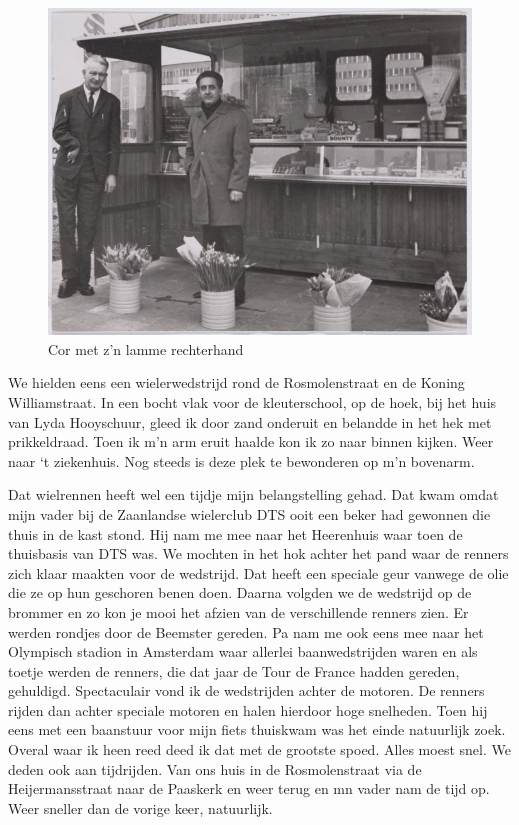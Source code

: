 \documentclass[10pt,twoside, openright]{memoir}
\begin{document}
\begin{figure}
\includegraphics[width=\textwidth]{img/79corknikker}
\caption*{\footnotesize Cor met z'n lamme rechterhand}
\end{figure}

We hielden eens een wielerwedstrijd rond de Rosmolenstraat en de Koning Williamstraat. In een bocht vlak voor de kleuterschool, op de hoek, bij het huis van Lyda Hooyschuur, gleed ik door zand onderuit en belandde in het hek met prikkeldraad. Toen ik m’n arm eruit haalde kon ik zo naar binnen kijken. Weer naar ‘t ziekenhuis. Nog steeds is deze plek te bewonderen op m’n bovenarm. 

Dat wielrennen heeft wel een tijdje mijn belangstelling gehad. Dat kwam omdat mijn vader bij de Zaanlandse wielerclub DTS ooit een beker had gewonnen die thuis in de kast stond. Hij nam me mee naar het Heerenhuis waar toen de thuisbasis van DTS was. We mochten in het hok achter het pand waar de renners zich klaar maakten voor de wedstrijd. Dat heeft een speciale geur vanwege de olie die ze op hun geschoren benen doen. Daarna volgden we de wedstrijd op de brommer en zo kon je mooi het afzien van de verschillende renners zien. Er werden rondjes door de Beemster gereden. Pa nam me ook eens mee naar het Olympisch stadion in Amsterdam waar allerlei baanwedstrijden waren en als toetje werden de renners, die dat jaar de Tour de France hadden gereden, gehuldigd. Spectaculair vond ik de wedstrijden achter de motoren. De renners rijden dan achter speciale motoren en halen hierdoor hoge snelheden. Toen hij eens met een baanstuur voor mijn fiets thuiskwam was het einde natuurlijk zoek. Overal waar ik heen reed deed ik dat met de grootste spoed. Alles moest snel. We deden ook aan tijdrijden. Van ons huis in de Rosmolenstraat via de Heijermansstraat naar de Paaskerk en weer terug en mn vader nam de tijd op. Weer sneller dan de vorige keer, natuurlijk.
\end{document}
